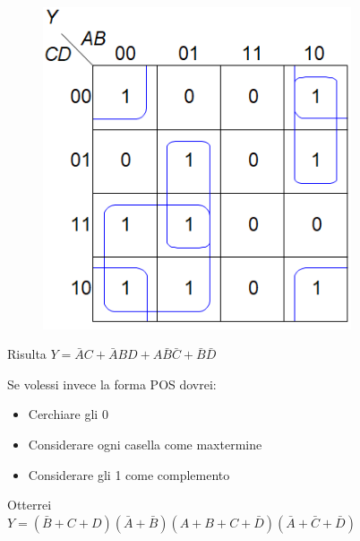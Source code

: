 \documentclass{article}
\begin{document}
\begin{figure}[ht]
\begin{minipage}[t]{0.49\textwidth}
\begin{table}[H]
\begin{tabular}{cccc|c}
        \end{tabular}
    \label{tab:k1}
    \end{table}
\end{minipage}
    \begin{minipage}[t]{0.49\textwidth}
        \centering
        \begin{figure}[H]
        \centering
        \includegraphics[width=\linewidth]{k1.png}
        \end{figure}
        \label{fig:k1}
    \end{minipage}

    \vspace{10pt}
    Risulta $Y=\bar{A}C+\bar{A}BD+A\bar{B}\bar{C}+\bar{B}\bar{D}$

    \vspace{15pt}

    Se volessi invece la forma POS dovrei:
    \begin{itemize}
        \item Cerchiare gli 0
        \item Considerare ogni casella come maxtermine
        \item Considerare gli 1 come complemento
    \end{itemize}

    \vspace{5pt}

    Otterrei $Y=(\bar{B}+C+D)(\bar{A}+\bar{B})(A+B+C+\bar{D})(\bar{A}+\bar{C}+\bar{D})$
    
\end{figure}
\end{document}

